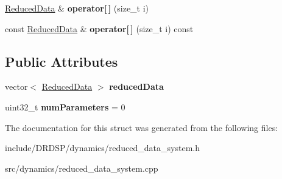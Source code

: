\begin{DoxyCompactItemize}
\item 
\hypertarget{struct_d_r_d_s_p_1_1_reduced_data_system_a483aaca2f16682806e08043b0407767e}{\hyperlink{struct_d_r_d_s_p_1_1_reduced_data}{Reduced\-Data} \& {\bfseries operator\mbox{[}$\,$\mbox{]}} (size\-\_\-t i)}\label{struct_d_r_d_s_p_1_1_reduced_data_system_a483aaca2f16682806e08043b0407767e}

\item 
\hypertarget{struct_d_r_d_s_p_1_1_reduced_data_system_aa14bf1bc623695cc20f1b4187ce0374b}{const \hyperlink{struct_d_r_d_s_p_1_1_reduced_data}{Reduced\-Data} \& {\bfseries operator\mbox{[}$\,$\mbox{]}} (size\-\_\-t i) const }\label{struct_d_r_d_s_p_1_1_reduced_data_system_aa14bf1bc623695cc20f1b4187ce0374b}

\end{DoxyCompactItemize}
\subsection*{Public Attributes}
\begin{DoxyCompactItemize}
\item 
\hypertarget{struct_d_r_d_s_p_1_1_reduced_data_system_ae4b8454c60cadde78da603168aa840f4}{vector$<$ \hyperlink{struct_d_r_d_s_p_1_1_reduced_data}{Reduced\-Data} $>$ {\bfseries reduced\-Data}}\label{struct_d_r_d_s_p_1_1_reduced_data_system_ae4b8454c60cadde78da603168aa840f4}

\item 
\hypertarget{struct_d_r_d_s_p_1_1_reduced_data_system_a18caccb6ac437c79aeb23e8b6c57389c}{uint32\-\_\-t {\bfseries num\-Parameters} = 0}\label{struct_d_r_d_s_p_1_1_reduced_data_system_a18caccb6ac437c79aeb23e8b6c57389c}

\end{DoxyCompactItemize}


The documentation for this struct was generated from the following files\-:\begin{DoxyCompactItemize}
\item 
include/\-D\-R\-D\-S\-P/dynamics/reduced\-\_\-data\-\_\-system.\-h\item 
src/dynamics/reduced\-\_\-data\-\_\-system.\-cpp\end{DoxyCompactItemize}
